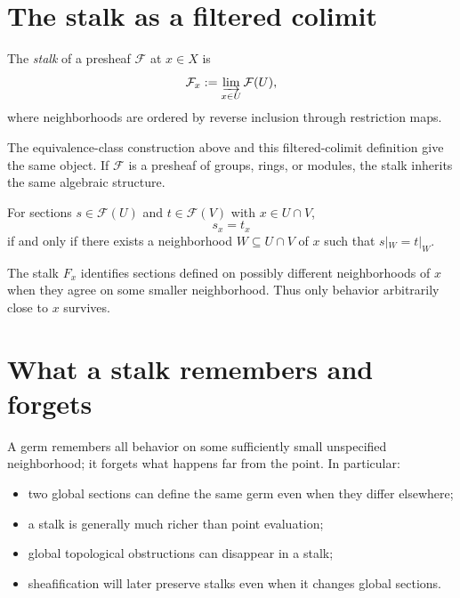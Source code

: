 \section{The stalk as a filtered colimit}

\begin{definition}[Stalk]
The \emph{stalk} of a presheaf $\mathcal F$ at $x\in X$ is
\[
\mathcal F_x:=\varinjlim_{x\in U}\mathcal F(U),
\]
where neighborhoods are ordered by reverse inclusion through restriction maps.
\end{definition}



The equivalence-class construction above and this filtered-colimit definition give the same
object.  If $\mathcal F$ is a presheaf of groups, rings, or modules, the stalk inherits the
same algebraic structure.

\begin{proposition}
For sections $s\in\mathcal F(U)$ and $t\in\mathcal F(V)$ with $x\in U\cap V$,
\[
s_x=t_x
\]
if and only if there exists a neighborhood $W\subseteq U\cap V$ of $x$ such that
$s|_W=t|_W$.
\end{proposition}

\begin{example}\label{ex:vi13-expand-02}
The stalk $F_x$ identifies sections defined on possibly different neighborhoods of $x$ when they agree on some smaller neighborhood.  Thus only behavior arbitrarily close to $x$ survives.
\end{example}
\section{What a stalk remembers and forgets}

A germ remembers all behavior on some sufficiently small unspecified neighborhood; it
forgets what happens far from the point.  In particular:
\begin{itemize}
\item two global sections can define the same germ even when they differ elsewhere;
\item a stalk is generally much richer than point evaluation;
\item global topological obstructions can disappear in a stalk;
\item sheafification will later preserve stalks even when it changes global sections.
\end{itemize}

